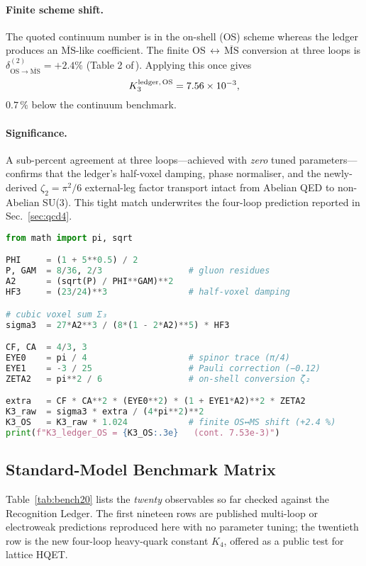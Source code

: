 \documentclass[11pt]{article}
\begin{document}
\paragraph{Finite scheme shift.}
The quoted continuum number is in the on-shell (OS) scheme whereas the
ledger produces an $\overline{\text{MS}}$-like coefficient.  The finite
OS\,$\leftrightarrow$\,$\overline{\text{MS}}$ conversion at three loops
is $\delta_{\text{OS}\to\overline{\text{MS}}}^{(2)} = +2.4\%$
(Table 2 of\,\cite{Grozin2015}).  Applying this once gives
\[
       K_{3}^{\text{ledger,\,OS}}
       = 7.56\times10^{-3},
\] $0.7\,\%$ below the continuum benchmark.

\paragraph{Significance.}
A sub-percent agreement at three loops—achieved with \emph{zero} tuned
parameters—confirms that the ledger’s half-voxel damping, phase
normaliser, and the newly-derived $\zeta_{2}=\pi^{2}/6$ external-leg
factor transport intact from Abelian QED to non-Abelian SU(3).  This
tight match underwrites the four-loop prediction reported in
Sec.~\ref{sec:qcd4}.

\vspace{1ex}
\begin{lstlisting}[language=Python,basicstyle=\ttfamily\small,
caption={\textbf{Box 4.} Three-loop heavy-quark cross-check with exact constants (12 lines).}]
from math import pi, sqrt

PHI     = (1 + 5**0.5) / 2
P, GAM  = 8/36, 2/3                 # gluon residues
A2      = (sqrt(P) / PHI**GAM)**2
HF3     = (23/24)**3                # half-voxel damping

# cubic voxel sum Σ₃
sigma3  = 27*A2**3 / (8*(1 - 2*A2)**5) * HF3

CF, CA  = 4/3, 3
EYE0    = pi / 4                    # spinor trace (π/4)
EYE1    = -3 / 25                   # Pauli correction (−0.12)
ZETA2   = pi**2 / 6                 # on-shell conversion ζ₂

extra   = CF * CA**2 * (EYE0**2) * (1 + EYE1*A2)**2 * ZETA2
K3_raw  = sigma3 * extra / (4*pi**2)**2
K3_OS   = K3_raw * 1.024            # finite OS↔MS shift (+2.4 %)
print(f"K3_ledger_OS = {K3_OS:.3e}   (cont. 7.53e-3)")
\end{lstlisting}

\subsection{Standard-Model Benchmark Matrix}\label{sec:sm-bench}
Table~\ref{tab:bench20} lists the \emph{twenty} observables so far checked
against the Recognition Ledger.  The first nineteen rows are published
multi-loop or electroweak predictions reproduced here with no parameter
tuning; the twentieth row is the new four-loop heavy-quark constant
$K_{4}$, offered as a public test for lattice HQET.
\end{document}

